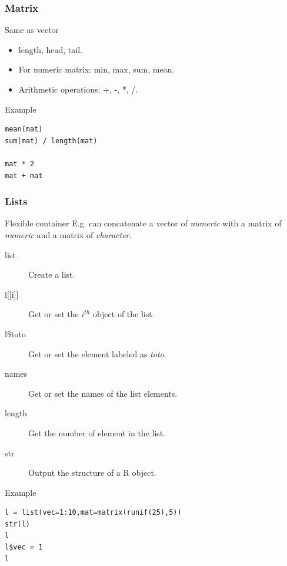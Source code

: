 \documentclass[10pt]{beamer}
\newenvironment{xframe}[2][]
  {\begin{frame}[fragile,environment=xframe,#1]
  \frametitle{#2}}
  {\end{frame}}
\begin{document}

\begin{xframe}{Matrix}
  \begin{block}{Same as {\sf vector}}
    \begin{itemize}
    \item {\sf length}, {\sf head}, {\sf tail}.
    \item For numeric matrix: {\sf min}, {\sf max}, {\sf sum}, {\sf mean}.
    \item Arithmetic operations: +, -, *, /.
    \end{itemize}
  \end{block}
  \begin{exampleblock}{Example}
\begin{verbatim}
mean(mat)
sum(mat) / length(mat)

mat * 2
mat + mat
\end{verbatim}
  \end{exampleblock}
\end{xframe}


\begin{xframe}{Lists}
  \begin{block}{Flexible container}
    E.g. can concatenate a {\sf vector} of {\it numeric} with a {\sf matrix} of {\it numeric} and a {\sf matrix} of {\it character}.
    \begin{description}
      \item[list] Create a list.
      \item[{l[[i]]} ] Get or set the $i^{th}$ object of the list.
      \item[l\$toto] Get or set the element labeled as {\it toto}.
      \item[names] Get or set the names of the list elements.
      \item[length] Get the number of element in the list.
      \item[str] Output the structure of a R object.
    \end{description}
  \end{block}
  \begin{exampleblock}{Example}
\begin{verbatim}
l = list(vec=1:10,mat=matrix(runif(25),5))
str(l)
l
l$vec = 1
l
\end{verbatim}
  \end{exampleblock}
\end{xframe}
\end{document}
